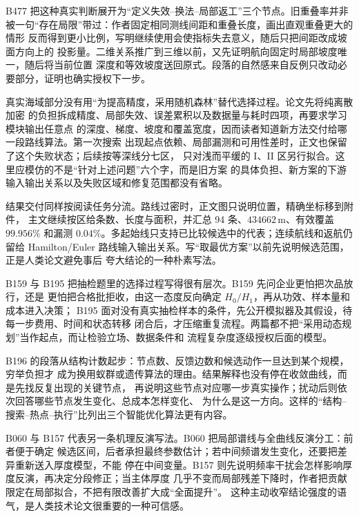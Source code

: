 B477 把这种真实判断展开为“定义失效--换法--局部返工”三个节点。旧重叠率并非
被一句“存在局限”带过：作者固定相同测线间距和重叠长度，画出直观重叠更大的情形
反而得到更小比例，写明继续使用会使指标失去意义，随后只把间距改成坡面方向上的
投影量。二维关系推广到三维以前，又先证明航向固定时局部坡度唯一，随后将当前位置
深度和等效坡度送回原式。段落的自然感来自反例只改动必要部分，证明也确实授权下一步。

真实海域部分没有用“为提高精度，采用随机森林”替代选择过程。论文先将纯离散加密
的负担拆成精度、局部失效、误差累积以及数据量与耗时四项，再要求学习模块输出任意点
的深度、梯度、坡度和覆盖宽度，因而读者知道新方法交付给哪一段路线算法。第一次搜索
出现起点依赖、局部漏测和可用性差时，正文也保留了这个失败状态；后续按等深线分七区，
只对浅而平缓的 I、II 区另行拟合。这里应模仿的不是“针对上述问题”六个字，而是旧方案
的具体负担、新方案的下游输入输出关系以及失败区域和修复范围都没有省略。

结果交付同样按阅读任务分流。路线过密时，正文图只说明位置，精确坐标移到附件，
主文继续按区给条数、长度与面积，并汇总 94 条、$434662\,\mathrm{m}$、有效覆盖
$99.956\%$ 和漏测 $0.04\%$。多起始线只支持已比较候选中的代表；连续航线和返航仍留给
Hamilton/Euler 路线输入输出关系。写“取最优方案”以前先说明候选范围，正是人类论文避免事后
夸大结论的一种朴素写法。

B159 与 B195 把抽检题里的选择过程写得很有层次。B159 先问企业更怕把次品放行，还是
更怕把合格批拒收，由这一态度反向确定 $H_0/H_1$，再从功效、样本量和成本进入决策；
B195 面对没有真实抽检样本的条件，先公开模拟器及其假设，待每一步费用、时间和状态转移
闭合后，才压缩重复流程。两篇都不把“采用动态规划”当作起点，而让检验立场、数据条件和
流程复杂度逐级授权后面的模型。

B196 的段落从结构计数起步：节点数、反馈边数和候选动作一旦达到某个规模，穷举负担才
成为换用蚁群或遗传算法的理由。结果解释也没有停在收敛曲线，而是先找反复出现的关键节点，
再说明这些节点对应哪一步真实操作；扰动后则依次回答哪些节点发生变化、总成本怎样变化、
为什么是这一方向。这样的“结构--搜索--热点--执行”比列出三个智能优化算法更有内容。

B060 与 B157 代表另一条机理反演写法。B060 把局部谱线与全曲线反演分工：前者便于确定
候选区间，后者承担最终参数估计；若中间频谱发生变化，还要把差异重新送入厚度模型，不能
停在中间变量。B157 则先说明频率干扰会怎样影响厚度反演，再决定分段修正；当主体厚度
几乎不变而局部残差下降时，作者把贡献限定在局部拟合，不把有限改善扩大成“全面提升”。
这种主动收窄结论强度的语气，是人类技术论文很重要的一种可信感。

